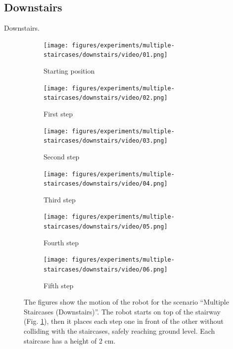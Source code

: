 \subsection{Downstairs}
Downstairs.
\begin{figure}
  \begin{subfigure}{0.48\textwidth}
    \texttt{[image: figures/experiments/multiple-staircases/downstairs/video/01.png]}
    \caption{Starting position}
    \label{fig:exp:ms:down:frame1}
  \end{subfigure}\hspace*{\fill}
  \begin{subfigure}{0.48\textwidth}
    \texttt{[image: figures/experiments/multiple-staircases/downstairs/video/02.png]}
    \caption{First step}
  \end{subfigure}
  \begin{subfigure}{0.48\textwidth}
    \texttt{[image: figures/experiments/multiple-staircases/downstairs/video/03.png]}
    \caption{Second step}
  \end{subfigure}\hspace*{\fill}
  \begin{subfigure}{0.48\textwidth}
    \texttt{[image: figures/experiments/multiple-staircases/downstairs/video/04.png]}
    \caption{Third step}
  \end{subfigure}
  \begin{subfigure}{0.48\textwidth}
    \texttt{[image: figures/experiments/multiple-staircases/downstairs/video/05.png]}
    \caption{Fourth step}
  \end{subfigure}\hspace*{\fill}
  \begin{subfigure}{0.48\textwidth}
    \texttt{[image: figures/experiments/multiple-staircases/downstairs/video/06.png]}
    \caption{Fifth step}
  \end{subfigure}
  \caption{The figures show the motion of the robot for the scenario
      ``Multiple Staircases (Downstairs)''. The robot starts on top of the 
      stairway (Fig. \ref{fig:exp:ms:down:frame1}), then it places 
      each step one in front of the other without colliding with the staircases,
      safely reaching ground level. Each staircase has a height of 2 cm.}
  \label{fig:experiments:multiple-staircases:downstairs:videoframes}
\end{figure}

